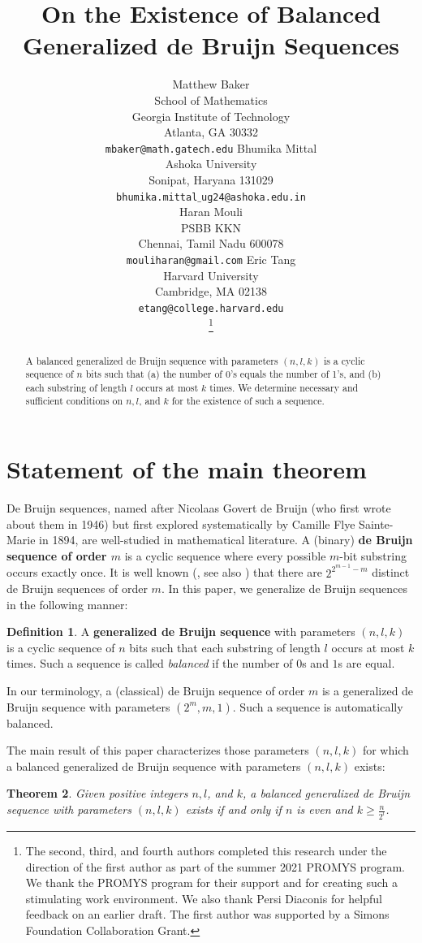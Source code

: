 \documentclass{article}
\title{On the Existence of Balanced Generalized de Bruijn Sequences}
\author{
  Matthew Baker \\
  School of Mathematics\\
  Georgia Institute of Technology\\
  Atlanta, GA 30332\\
  \texttt{mbaker@math.gatech.edu}
  \And
  Bhumika Mittal \\
  Ashoka University\\
  Sonipat, Haryana 131029 \\
  \texttt{bhumika.mittal$\_$ug24@ashoka.edu.in} \\
  \And
  Haran Mouli \\
  PSBB KKN\\
  Chennai, Tamil Nadu 600078 \\
  \texttt{mouliharan@gmail.com} 
  \And
  Eric Tang \\
  Harvard University\\
  Cambridge, MA 02138 \\
  \texttt{etang@college.harvard.edu} \\
   
 \thanks{The second, third, and fourth authors completed this research under the direction of the first author as part of the summer 2021 PROMYS program. We thank the PROMYS program for their support and for creating such a stimulating work environment. We also thank Persi Diaconis for helpful feedback on an earlier draft. The first author was supported by a Simons Foundation Collaboration Grant.}


}
\theoremstyle{plain}
\newtheorem{theorem}{Theorem}
\theoremstyle{definition}
\newtheorem{definition}[theorem]{Definition}
\theoremstyle{remark}
\begin{document}
\maketitle
\begin{abstract}
A balanced generalized de Bruijn sequence with parameters $(n,l,k)$ is a cyclic sequence of $n$ bits such that (a) the number of 0's equals the number of 1's, and (b) each substring of length $l$ occurs at most $k$ times. 
We determine necessary and sufficient conditions on $n,l$, and $k$ for the existence of such a sequence.
\end{abstract}

\section{Statement of the main theorem}

De Bruijn sequences, named after Nicolaas Govert de Bruijn (who first wrote about them in 1946) but first explored systematically
by Camille Flye Sainte-Marie in 1894, are well-studied in mathematical literature. A (binary) \textbf{de Bruijn sequence of order $m$} is a cyclic sequence where every possible $m$-bit substring occurs exactly once. It is well known (\cite{deBruijn}, see also \cite{Hall}) that there are $2^{2^{m-1} - m}$ distinct de Bruijn sequences of order $m$.
In this paper, we generalize de Bruijn sequences in the following manner:

\medskip

\begin{definition} 
A \textbf{generalized de Bruijn sequence} with parameters $(n,l,k)$ is a cyclic sequence of $n$ bits such that each substring of length $l$ occurs at most $k$ times. Such a sequence is called {\em balanced} if the number of $0$s and $1$s are equal.
\end{definition}

In our terminology, a (classical) de Bruijn sequence of order $m$ is a generalized de Bruijn sequence with parameters $(2^m,m,1)$. Such a sequence is automatically balanced.

The main result of this paper characterizes those parameters $(n,l,k)$ for which a balanced generalized de Bruijn sequence with parameters $(n,l,k)$ exists:

\medskip

\begin{theorem} \label{maintheorem}
Given positive integers $n,l$, and $k$, a balanced generalized de Bruijn sequence with parameters $(n,l,k)$ exists if and only if $n$ is even and $k \geqslant \frac{n}{2^l}$.
\end{theorem}
\end{document}
